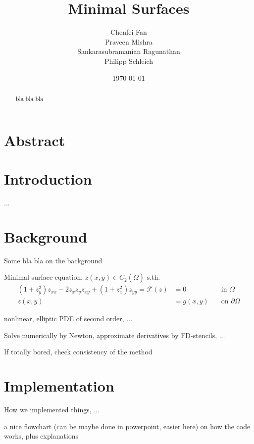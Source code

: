 \documentclass[11pt]{scrartcl}
\title{Minimal Surfaces}
\author{{Chenfei Fan \\  Praveen Mishra \\ Sankarasubramanian Ragunathan\\ Philipp Schleich}}
\date{\today \\ \vspace{0.9cm}}
\newcommand{\minSurf}[1]{\ensuremath{\mathcal{F}(#1)}}
\begin{document}
\maketitle

\section*{Abstract}
\begin{abstract}
\noindent bla bla bla 
\end{abstract}

\clearpage
\protect \tableofcontents



\newpage
	
\onehalfspacing
\section{Introduction}
...
\section{Background}
Some bla bla on the background

Minimal surface equation, $z(x,y)\in C_2(\bar{\Omega})$ s.th.
\begin{align}
	(1+z_y^2) z_{xx} - 2 z_x z_y z_{xy} + (1+z_x^2)z_{yy} = \minSurf{z} &= 0 \quad &\text{in } \Omega \\
	z(x,y) &= g(x,y) \quad &\text{on } \partial \Omega
\end{align}

nonlinear, elliptic PDE of second order, ...

Solve numerically by Newton, approximate derivatives by FD-stencils, ...

If totally bored, check consistency of the method



\section{Implementation}

How we implemented things, ...

a nice flowchart (can be maybe done in powerpoint, easier here) on how the code works, plus explanations
\end{document}
